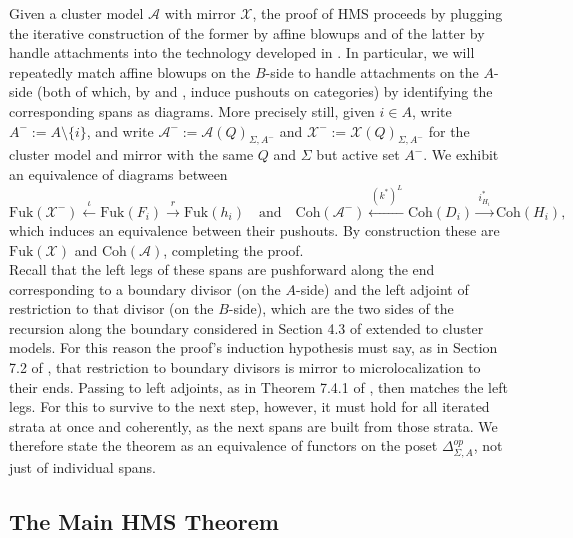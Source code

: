 \documentclass[11pt]{amsart}
\theoremstyle{definition}
\theoremstyle{remark}
\newcommand{\A}{\mathcal{A}}
\newcommand{\X}{\mathcal{X}}
\newcommand{\Coh}{\mathrm{Coh}}
\newcommand{\Fuk}{\mathrm{Fuk}}
\numberwithin{equation}{section}
\begin{document}
Given a cluster model $\A$ with mirror $\X$, the proof of HMS proceeds by plugging the iterative construction of the former by affine blowups and of the latter by handle attachments into the technology developed in \cite{GL}. In particular, we will repeatedly match affine blowups on the $B$-side to handle attachments on the $A$-side (both of which, by \cite{GL} and \cite{GPSI}, induce pushouts on categories) by identifying the corresponding spans as diagrams. More precisely still, given $i\in A$, write $A^-:=A\setminus\{i\}$, and write $\mathcal A^-:=\mathcal A(Q)_{\Sigma,A^-}$ and $\mathcal X^-:=\mathcal X(Q)_{\Sigma,A^-}$ for the cluster model and mirror with the same $Q$ and $\Sigma$ but active set $A^-$. We exhibit an equivalence of diagrams between
$$
\Fuk(\mathcal{X}^-)\xleftarrow{\,\iota\,}\Fuk(F_i)\xrightarrow{\,r\,}\Fuk(h_i) \quad \text{and}\quad \Coh(\mathcal{A}^-)\xleftarrow{\,(k^*)^L\,}\Coh(D_i)\xrightarrow{\,i^*_{H_i}\,}\Coh(H_i),
$$
which induces an equivalence between their pushouts. By construction these are $\Fuk(\X)$ and $\Coh(\A)$, completing the proof.\\

Recall that the left legs of these spans are pushforward along the end corresponding to a boundary divisor (on the $A$-side) and the left adjoint of restriction to that divisor (on the $B$-side), which are the two sides of the recursion along the boundary considered in Section 4.3 of \cite{gammage2022mirror} extended to cluster models. For this reason the proof's induction hypothesis must say, as in Section 7.2 of \cite{gammage2022mirror}, that restriction to boundary divisors is mirror to microlocalization to their ends. Passing to left adjoints, as in Theorem 7.4.1 of \cite{gammage2022mirror}, then matches the left legs. For this to survive to the next step, however, it must hold for all iterated strata at once and coherently, as the next spans are built from those strata. We therefore state the theorem as an equivalence of functors on the poset $\Delta_{\Sigma,A}^{op}$, not just of individual spans.

\subsection{The Main HMS Theorem} 
\end{document}

